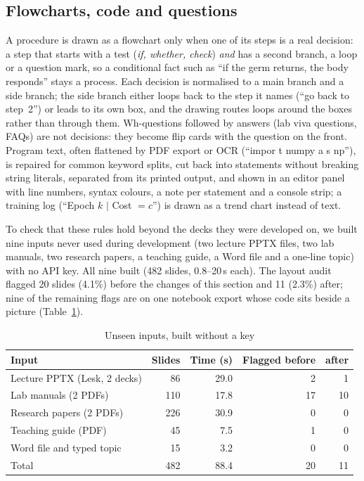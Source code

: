 \documentclass[conference]{IEEEtran}
\begin{document}
\subsection{Flowcharts, code and questions}
A procedure is drawn as a flowchart only when one of its steps is a real decision: a step that starts with a test
(\emph{if, whether, check}) \emph{and} has a second branch, a loop or a question mark, so a conditional fact such as ``if the germ
returns, the body responds'' stays a process. Each decision is normalised to a main branch and a side branch; the side branch
either loops back to the step it names (``go back to step~2'') or leads to its own box, and the drawing routes loops around the
boxes rather than through them. Wh-questions followed by answers (lab viva questions, FAQs) are not decisions: they become flip
cards with the question on the front. Program text, often flattened by PDF export or OCR (``impor t numpy a s np''), is repaired
for common keyword splits, cut back into statements without breaking string literals, separated from its printed output, and
shown in an editor panel with line numbers, syntax colours, a note per statement and a console strip; a training log
(``Epoch $k$ $|$ Cost $=c$'') is drawn as a trend chart instead of text.

To check that these rules hold beyond the decks they were developed on, we built nine inputs never used during development
(two lecture PPTX files, two lab manuals, two research papers, a teaching guide, a Word file and a one-line topic) with no API
key. All nine built (482 slides, 0.8--20\,s each). The layout audit flagged 20 slides (4.1\%) before the changes of this
section and 11 (2.3\%) after; nine of the remaining flags are on one notebook export whose code sits beside a picture
(Table~\ref{tab:robust}).

\begin{table}[H]
\centering
\caption{Unseen inputs, built without a key}
\label{tab:robust}
\setlength{\tabcolsep}{3pt}
\begin{tabular}{lrrrr}
\toprule
Input & Slides & Time (s) & Flagged before & after \\
\midrule
Lecture PPTX (Lesk, 2 decks) & 86 & 29.0 & 2 & 1 \\
Lab manuals (2 PDFs) & 110 & 17.8 & 17 & 10 \\
Research papers (2 PDFs) & 226 & 30.9 & 0 & 0 \\
Teaching guide (PDF) & 45 & 7.5 & 1 & 0 \\
Word file and typed topic & 15 & 3.2 & 0 & 0 \\
\midrule
Total & 482 & 88.4 & 20 & 11 \\
\bottomrule
\end{tabular}
\end{table}
\end{document}
